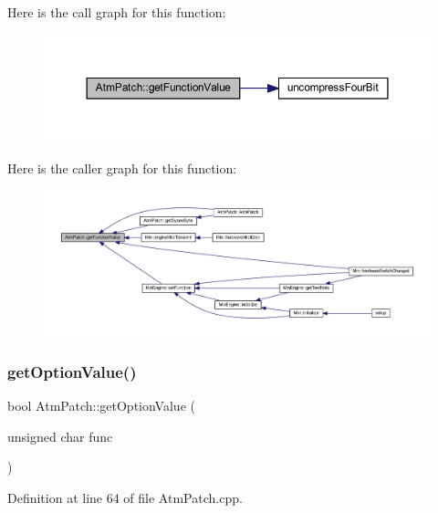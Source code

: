 Here is the call graph for this function\+:
\nopagebreak
\begin{figure}[H]
\begin{center}
\leavevmode
\includegraphics[width=350pt]{class_atm_patch_a7b4184a7f5bd314e150f9ad38cc3a0fb_cgraph}
\end{center}
\end{figure}
Here is the caller graph for this function\+:
\nopagebreak
\begin{figure}[H]
\begin{center}
\leavevmode
\includegraphics[width=350pt]{class_atm_patch_a7b4184a7f5bd314e150f9ad38cc3a0fb_icgraph}
\end{center}
\end{figure}
\mbox{\label{class_atm_patch_ab521c0a108bf7f8bc848755c38330bc0}} 
\subsubsection{\texorpdfstring{get\+Option\+Value()}{getOptionValue()}}
{\footnotesize\ttfamily bool Atm\+Patch\+::get\+Option\+Value (\begin{DoxyParamCaption}\item[{unsigned char}]{func }\end{DoxyParamCaption})}



Definition at line 64 of file Atm\+Patch.\+cpp.

